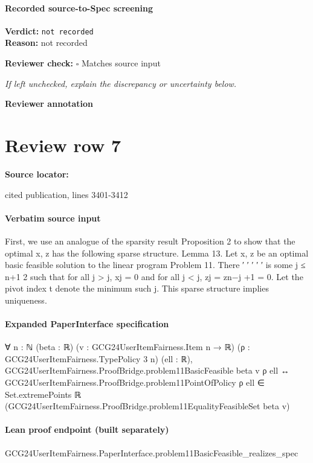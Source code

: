\documentclass[10pt]{article}
\newcommand{\reviewerbox}{%
  \par\noindent\fbox{\parbox{0.96\linewidth}{\rule{0pt}{0.38in}}}\par
}
\newcommand{\reviewmatch}[1]{%
  \par\noindent\textbf{Reviewer check:} $\square$\; #1\par
  \noindent\emph{If left unchecked, explain the discrepancy or uncertainty below.}\par
}
\begin{document}
\paragraph{Recorded source-to-Spec screening}
\textbf{Verdict:} \texttt{not recorded}
\\
\textbf{Reason:} not recorded
\reviewmatch{Matches source input}
\noindent\textbf{Reviewer annotation}\par
\reviewerbox
\clearpage
\hypertarget{source-claim-326f5e510283a532}{}
\section*{Review row 7}
\textbf{Source locator:} {\footnotesize\raggedright cited publication, lines 3401-\allowbreak{}3412\par}
\paragraph{Verbatim source input}
\begin{ReviewVerbatim}
First, we use an analogue of the sparsity result Proposition 2 to show that the optimal x, z has the
following sparse structure.
Lemma 13. Let x, z be an optimal basic feasible solution to the linear program Problem 11. There
′
′
′
′
′
is some j ≤ n+1
2 such that for all j > j, xj = 0 and for all j < j, zj = zn−j +1 = 0. Let the
pivot index t denote the minimum such j.
This sparse structure implies uniqueness.
\end{ReviewVerbatim}


\paragraph{Expanded PaperInterface specification}
\begin{ReviewVerbatim}
∀ {n : ℕ} (beta : ℝ) (v : GCG24UserItemFairness.Item n → ℝ) (ρ : GCG24UserItemFairness.TypePolicy 3 n) (ell : ℝ),
  GCG24UserItemFairness.ProofBridge.problem11BasicFeasible beta v ρ ell ↔
    GCG24UserItemFairness.ProofBridge.problem11PointOfPolicy ρ ell ∈
      Set.extremePoints ℝ (GCG24UserItemFairness.ProofBridge.problem11EqualityFeasibleSet beta v)
\end{ReviewVerbatim}

\paragraph{Lean proof endpoint (built separately)}\begin{ReviewVerbatim}
GCG24UserItemFairness.PaperInterface.problem11BasicFeasible_realizes_spec
\end{ReviewVerbatim}
\end{document}
